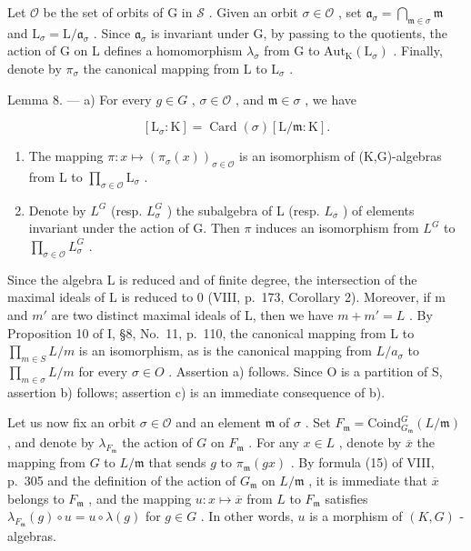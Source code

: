 Let \(\mathcal{O}\) be the set of orbits of G in \(\mathcal{S}\) . Given an orbit \(\sigma \in \mathcal{O}\) , set \(\mathfrak{a}_{\sigma} = \bigcap_{\mathfrak{m} \in \sigma} \mathfrak{m}\) and \(\mathrm{L}_{\sigma} = \mathrm{L} / \mathfrak{a}_{\sigma}\) . Since \(\mathfrak{a}_{\sigma}\) is invariant under G, by passing to the quotients, the action of G on L defines a homomorphism \(\lambda_{\sigma}\) from G to \(\mathrm{Aut}_{\mathrm{K}}(\mathrm{L}_{\sigma})\) . Finally, denote by \(\pi_{\sigma}\) the canonical mapping from L to \(\mathrm{L}_{\sigma}\) .

Lemma 8. --- a) For every \(g \in G\) , \(\sigma \in \mathcal{O}\) , and \(\mathfrak{m} \in \sigma\) , we have

\[
[ \mathrm{L} _ {\sigma}: \mathrm{K} ] = \operatorname{Card} (\sigma) [ \mathrm{L} / \mathfrak {m}: \mathrm{K} ].
\]

\begin{enumerate}
\def\labelenumi{\alph{enumi})}
\setcounter{enumi}{1}
\item
  The mapping \(\pi : x \mapsto (\pi_{\sigma}(x))_{\sigma \in \mathcal{O}}\) is an isomorphism of (K,G)-algebras from L to \(\prod_{\sigma \in \mathcal{O}} \mathrm{L}_{\sigma}\) .
\item
  Denote by \(L^{G}\) (resp. \(L_{\sigma}^{G}\) ) the subalgebra of L (resp. \(L_{\sigma}\) ) of elements invariant under the action of G. Then \(\pi\) induces an isomorphism from \(L^{G}\) to \(\prod_{\sigma\in\mathcal{O}}L_{\sigma}^{G}\) .
\end{enumerate}

Since the algebra L is reduced and of finite degree, the intersection of the maximal ideals of L is reduced to 0 (VIII, p.~173, Corollary 2). Moreover, if m and \(m'\) are two distinct maximal ideals of L, then we have \(m + m' = L\) . By Proposition 10 of I, §8, No.~11, p.~110, the canonical mapping from L to \(\prod_{m \in S} L/m\) is an isomorphism, as is the canonical mapping from \(L/a_{\sigma}\) to \(\prod_{m \in \sigma} L/m\) for every \(\sigma \in O\) . Assertion a) follows. Since O is a partition of S, assertion b) follows; assertion c) is an immediate consequence of b).

Let us now fix an orbit \(\sigma \in \mathcal{O}\) and an element \(\mathfrak{m}\) of \(\sigma\) . Set \(F_{\mathfrak{m}} = \text{Coind}_{G_{\mathfrak{m}}}^{G}(L/\mathfrak{m})\) , and denote by \(\lambda_{F_{\mathfrak{m}}}\) the action of \(G\) on \(F_{\mathfrak{m}}\) . For any \(x \in L\) , denote by \(\overline{x}\) the mapping from \(G\) to \(L/\mathfrak{m}\) that sends \(g\) to \(\pi_{\mathfrak{m}}(gx)\) . By formula (15) of VIII, p.~305 and the definition of the action of \(G_{\mathfrak{m}}\) on \(L/\mathfrak{m}\) , it is immediate that \(\overline{x}\) belongs to \(F_{\mathfrak{m}}\) , and the mapping \(u: x \mapsto \overline{x}\) from \(L\) to \(F_{\mathfrak{m}}\) satisfies \(\lambda_{F_{\mathfrak{m}}}(g) \circ u = u \circ \lambda(g)\) for \(g \in G\) . In other words, \(u\) is a morphism of \((K, G)\) -algebras.

